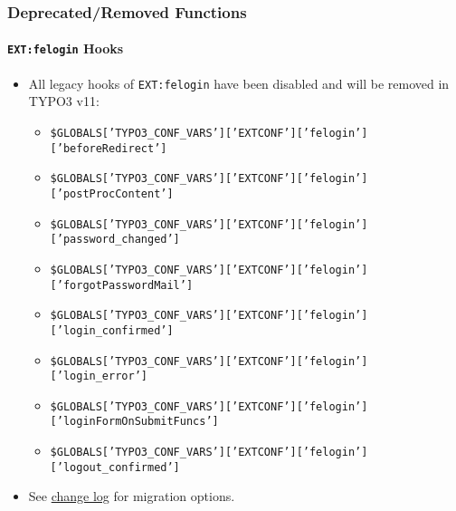 \begin{frame}[fragile]
	\frametitle{Deprecated/Removed Functions}
	\framesubtitle{\texttt{EXT:felogin} Hooks}

	\lstset{basicstyle=\tiny\ttfamily}

	\begin{itemize}
		\item All legacy hooks of \texttt{EXT:felogin} have been disabled and
			will be removed in TYPO3 v11:

			\begin{itemize}\tiny
				\item \texttt{\$GLOBALS['TYPO3\_CONF\_VARS']['EXTCONF']['felogin']['beforeRedirect']}
				\item \texttt{\$GLOBALS['TYPO3\_CONF\_VARS']['EXTCONF']['felogin']['postProcContent']}
				\item \texttt{\$GLOBALS['TYPO3\_CONF\_VARS']['EXTCONF']['felogin']['password\_changed']}
				\item \texttt{\$GLOBALS['TYPO3\_CONF\_VARS']['EXTCONF']['felogin']['forgotPasswordMail']}
				\item \texttt{\$GLOBALS['TYPO3\_CONF\_VARS']['EXTCONF']['felogin']['login\_confirmed']}
				\item \texttt{\$GLOBALS['TYPO3\_CONF\_VARS']['EXTCONF']['felogin']['login\_error']}
				\item \texttt{\$GLOBALS['TYPO3\_CONF\_VARS']['EXTCONF']['felogin']['loginFormOnSubmitFuncs']}
				\item \texttt{\$GLOBALS['TYPO3\_CONF\_VARS']['EXTCONF']['felogin']['logout\_confirmed']}
			\end{itemize}

		\item See
			\href{https://docs.typo3.org/c/typo3/cms-core/master/en-us/Changelog/10.4/Deprecation-88740-DeprecateFeloginPibasePlugin.html}{change log}
			for migration options.
	\end{itemize}

\end{frame}


